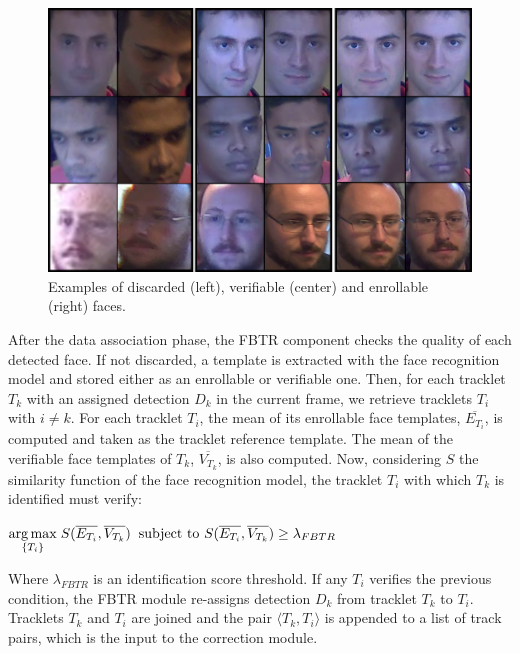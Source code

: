 \begin{figure}[b!]
\centering
\includegraphics[width=\linewidth]{images/snaps.png}
\caption{Examples of discarded (left), verifiable (center) and enrollable (right) faces.}
\label{fig:sample_snaps}
\end{figure}

After the data association phase, the FBTR component checks the quality of each detected face. If not discarded, a template is extracted with the face recognition model and stored either as an enrollable or verifiable one. Then, for each tracklet $T_k$ with an assigned detection $D_k$ in the current frame, we retrieve tracklets $T_i$ with $i\neq k$. For each tracklet $T_i$, the mean of its enrollable face templates, $\overline{E_{T_i}}$, is computed and taken as the tracklet reference template. The mean of the verifiable face templates of $T_k$, $\overline{V_{T_k}}$, is also computed. Now, considering $S$ the similarity function of the face recognition model, the tracklet $T_i$ with which $T_k$ is identified must verify:

\vspace{2mm}

$\underset{{\{T_i\}}}{\arg\max}\hspace{1mm}S(\overline{E_{T_i}}, \overline{V_{T_k}})\hspace{2mm}\text{subject to}\hspace{1.2mm} 
 S(\overline{E_{T_i}}, \overline{V_{T_k}})\geq \lambda_{FBTR}$
 
 \vspace{3mm}
 
\noindent Where $\lambda_{FBTR}$ is an identification score threshold. If any $T_i$ verifies the previous condition, the FBTR module re-assigns detection $D_k$ from tracklet $T_k$ to $T_i$. Tracklets $T_k$ and $T_i$ are joined and the pair $\langle T_k, T_i\rangle$ is appended to a list of track pairs, which is the input to the correction module.



